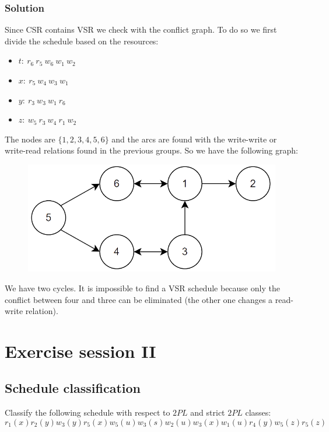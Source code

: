\documentclass[12pt, a4paper]{report}
\newtheorem[style=M,bodystyle=\normalfont]{theorem}{Theorem}
\newtheorem[style=M,bodystyle=\normalfont]{corollary}{Corollary}
\newtheorem[style=M,bodystyle=\normalfont]{lemma}{Lemma}
\newtheorem[style=M,bodystyle=\normalfont]{definition}{Definition}
\begin{document}
    \subsection*{Solution}
        Since CSR contains VSR we check with the conflict graph. To do so we first divide the schedule based on the resources: 
        \begin{itemize}
            \item $t: \: r_6 \: r_5 \: w_6 \: w_1 \: w_2$
            \item $x: \: r_5 \: w_4 \: w_3 \: w_1$
            \item $y: \: r_3 \: w_3 \: w_1 \: r_6$
            \item $z: \: w_5 \: r_3 \: w_4 \: r_1 \: w_2$
        \end{itemize}
        The nodes are $\{1,2,3,4,5,6\}$ and the arcs are found with the write-write or write-read relations found in the previous groups. So we have the following graph:
        \begin{figure}[H]
            \centering
            \includegraphics[width=0.5\linewidth]{images/conflictgraph3.png}
        \end{figure}
        We have two cycles. It is impossible to find a VSR schedule because only the conflict between four and three can be eliminated (the other one changes a read-write relation).

    \newpage

    \chapter{Exercise session II}

    \section{Schedule classification}
        Classify the following schedule with respect to $2PL$ and strict $2PL$ classes: 
        \[r_1(x) r_2(y) w_3(y) r_5(x) w_5(u) w_3(s) w_2(u) w_3(x) w_1(u) r_4(y) w_5(z) r_5(z)\]
\end{document}
